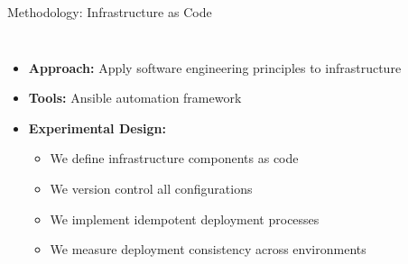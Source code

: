 \documentclass[aspectratio=169]{beamer}
\begin{document}
\begin{frame}{Methodology: Infrastructure as Code}
  \begin{columns}
    \begin{itemize}
      \item \textbf{Approach:} Apply software engineering principles to infrastructure
      \item \textbf{Tools:} Ansible automation framework
      \item \textbf{Experimental Design:}
        \begin{itemize}
          \item We define infrastructure components as code
          \item We version control all configurations
          \item We implement idempotent deployment processes
          \item We measure deployment consistency across environments
        \end{itemize}
    \end{itemize}
    
    \begin{center}
    \end{center}
  \end{columns}
\end{frame}
\end{document}
